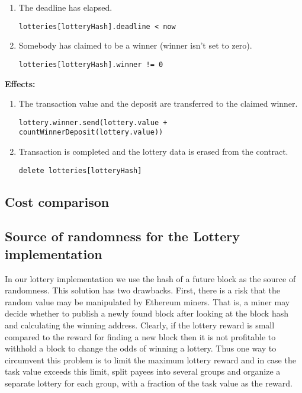 \documentclass[a4paper]{article}
\begin{document}
\begin{enumerate}
            \begin{enumerate}
                \item The deadline has elapsed.
                    \begin{center}
		                \texttt{lotteries[lotteryHash].deadline < now}
		            \end{center}
                \item Somebody has claimed to be a winner (winner isn't set to zero).
                    \begin{center}
                        \texttt{lotteries[lotteryHash].winner != 0}
                    \end{center}
            \end{enumerate}
            \textbf{Effects:}
            \begin{enumerate}
                \item The transaction value and the deposit are transferred to the claimed winner.
                    \begin{center}
			            \texttt{lottery.winner.send(lottery.value + countWinnerDeposit(lottery.value))}
			        \end{center}
                \item Transaction is completed and the lottery data is erased from the contract.
                    \begin{center}
                        \texttt{delete lotteries[lotteryHash]}
                    \end{center}
           \end{enumerate}
    \end{enumerate}
\subsection{Cost comparison}
\subsection{Source of randomness for the Lottery implementation}
\label{sec:randomness}
    In our lottery implementation we use the hash of a future block as the source of randomness. This solution has
    two drawbacks. First, there is a risk that the random value may be manipulated by Ethereum miners. That is,
    a miner may decide whether to publish a newly found block after looking at the block hash and calculating
    the winning address. Clearly, if the lottery reward is small compared to the reward for finding a new block
    then it is not profitable to withhold a block to change the odds of winning a lottery. Thus one way to circumvent
    this problem is to limit the maximum lottery reward and in case the task value exceeds this limit, split payees
    into several groups and organize a separate lottery for each group, with a fraction of the task value as the
    reward.
\end{document}

